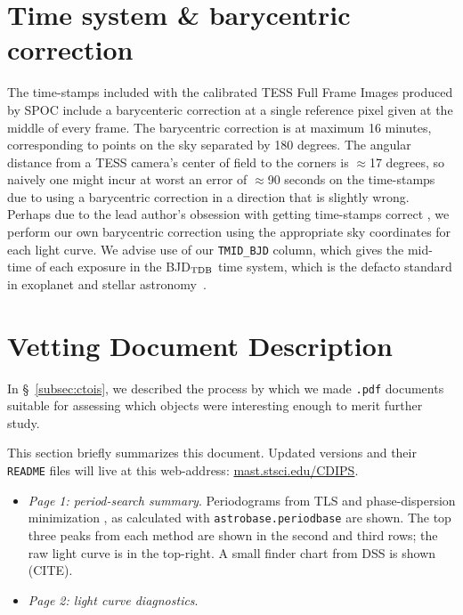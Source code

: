 \documentclass[12pt,twocolumn,tighten]{aastex62}
\begin{document}
\appendix
\section{Time system \& barycentric correction}
The time-stamps included with the calibrated TESS Full Frame Images
produced by SPOC include a barycenteric correction at
a single reference pixel given at the middle of every frame.
The barycentric correction is at maximum 16 minutes, corresponding to
points on the sky separated by 180 degrees.
The angular distance from a TESS camera's center of field to the corners
is $\approx$17 degrees, so naively one might incur at worst an error of
$\approx$90 seconds on the time-stamps due to using a barycentric
correction in a direction that is slightly wrong.
Perhaps due to the lead author's obsession with getting time-stamps correct 
\citep{bouma_wasp-4b_2019},
we perform our own barycentric correction using the appropriate
sky coordinates for each light curve.
We advise use of our \texttt{TMID\_BJD} column, which gives the
mid-time of each exposure in the BJD$_{\rm TDB}$ time system, which
is the defacto standard in exoplanet and stellar
astronomy~\citep{eastman_achieving_2010}.

\section{Vetting Document Description}

In \S~\ref{subsec:ctois}, we described the process by which we made 
\texttt{.pdf} documents suitable for assessing which objects were interesting 
enough to merit further study.

This section briefly summarizes this document. Updated versions and their 
\texttt{README} files will live at this web-address: 
\url{mast.stsci.edu/CDIPS}.

\begin{itemize}
\item {\it Page 1: period-search summary}. Periodograms from TLS and 
phase-dispersion minimization 
\citep{hippke_TLS_2019,stellingwerf_period_1978}, as calculated 
with \texttt{astrobase.periodbase} are shown. The top three peaks from each 
method are shown in the second and third rows; the raw light curve is in the 
top-right. A small finder chart from DSS is shown (CITE).

\item {\it Page 2: light curve diagnostics}.
\end{itemize}
\end{document}
